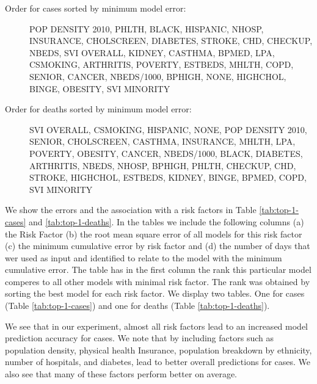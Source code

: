 \documentclass[a4paper, inpress]{jds} %
\renewcommand{\_}{%
    \textunderscore\hspace{0pt}%
}
\begin{document}
\begin{description}

\item[Order for cases sorted by minimum model error:] 
  POP\_DENSITY\_2010, PHLTH, BLACK, HISPANIC, NHOSP, INSURANCE, 
  CHOLSCREEN, DIABETES, STROKE, CHD, CHECKUP, NBEDS, SVI\_OVERALL, 
  KIDNEY, CASTHMA, BPMED, LPA, CSMOKING, ARTHRITIS, POVERTY, ESTBEDS, 
  MHLTH, COPD, SENIOR, CANCER, NBEDS/1000, BPHIGH, NONE, HIGHCHOL, 
  BINGE, OBESITY, SVI\_MINORITY

\item[Order for deaths sorted by minimum model error:] 
  SVI\_OVERALL, CSMOKING, HISPANIC, NONE, POP\_DENSITY\_2010, 
  SENIOR, CHOLSCREEN, CASTHMA, INSURANCE, MHLTH, LPA, 
  POVERTY, OBESITY, CANCER, NBEDS/1000, BLACK, DIABETES, ARTHRITIS, 
  NBEDS, NHOSP, BPHIGH, PHLTH, CHECKUP, CHD, STROKE, HIGHCHOL, 
  ESTBEDS, KIDNEY, BINGE, BPMED, COPD, SVI\_MINORITY

\end{description}

We show the errors and the association with a risk factors in Table
 \ref{tab:top-1-cases} and \ref{tab:top-1-deaths}. In the tables we include the following columns (a) the Risk Factor (b) the root mean square error of all models for this risk factor (c) the minimum cumulative error by risk factor and (d) the number of days that wer used as input and identified to relate to the model with the minimum cumulative error. The table has in the first column the rank this particular model comperes to all other models with minimal risk factor. 
The rank was obtained by sorting the best model for each risk factor. 
We display two tables. One for cases (Table \ref{tab:top-1-cases}) and one for deaths (Table \ref{tab:top-1-deaths}).

We see that in our experiment, almost all risk factors lead to an increased
model prediction accuracy for cases.  We note that by including
factors such as population density, physical health Insurance,
population breakdown by ethnicity, number of hospitals, and diabetes,
lead to better overall predictions for cases. 
We also see that
many of these factors perform better on average.
\end{document}

